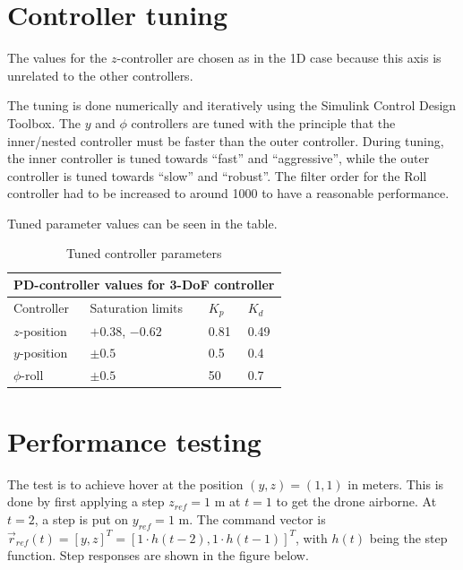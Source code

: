 \documentclass[a4paper]{report}
\begin{document}
\section{Controller tuning}

The values for the $z$-controller are chosen as in the 1D case because this axis is unrelated to the other controllers.

The tuning is done numerically and iteratively using the Simulink Control Design Toolbox.
The $y$ and $\phi$ controllers are tuned with the principle that the inner/nested controller must be faster than the outer controller.
During tuning, the inner controller is tuned towards ``fast'' and ``aggressive'', while 
the outer controller is tuned towards ``slow'' and ``robust''.
The filter order for the Roll controller had to be increased to around 1000 to have a reasonable performance.

Tuned parameter values can be seen in the table.

\begin{table}[h!]
\centering
\begin{tabular}{ |p{5cm}||p{3cm}|p{3cm}|p{3cm}|  }
\hline
\multicolumn{4}{|c|}{PD-controller values for 3-\gls{DoF} controller} \\
\hline
Controller & Saturation limits & $K_p$ & $K_d$ \\
\hline
$z$-position  & $+0.38$, $-0.62$ & \num{0.81}   & \num{0.49} \\
$y$-position  & $\pm 0.5$              & \num{0.5}     & \num{0.4}  \\
$\phi$-roll     &  $\pm 0.5$              & \num{50}      & \num{0.7} \\
\hline
\end{tabular}
\caption{Tuned controller parameters \label{fig:pd_values}}
\end{table}

\section{Performance testing}

The test is to achieve hover at the position $(y,z)=(1,1)$ in meters. 
This is done by first applying a step $z_{ref}=1$ m at $t=1$ to get the drone airborne.
At $t=2$, a step is put on $y_{ref}=1$ m.
The command vector is $\vec{r}_{ref}(t)=[y, z]^T = [1 \cdot h(t-2), 1 \cdot h(t-1)]^T$, with $h(t)$ being the step function. Step responses are shown in the figure below.
\end{document}
